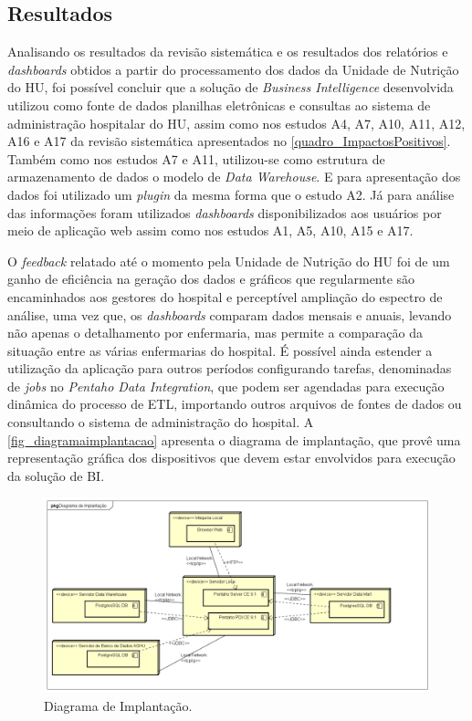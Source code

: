 \subsection{Resultados}

Analisando os resultados da revisão sistemática e os resultados dos relatórios e \textit{dashboards} obtidos a partir do processamento dos dados da Unidade de Nutrição do HU, foi possível concluir que a solução de \textit{Business Intelligence} desenvolvida utilizou como fonte de dados planilhas eletrônicas e consultas ao sistema de administração hospitalar do HU, assim como nos estudos A4, A7, A10, A11, A12, A16 e A17 da revisão sistemática apresentados no \autoref{quadro_ImpactosPositivos}. Também como nos estudos A7 e A11, utilizou-se como estrutura de armazenamento de dados o modelo de \textit{Data Warehouse}. E para apresentação dos dados foi utilizado um \textit{plugin} da mesma forma que o estudo A2. Já para análise das informações foram utilizados \textit{dashboards} disponibilizados aos usuários por meio de aplicação web assim como nos estudos A1, A5, A10, A15 e A17.

O \textit{feedback} relatado até o momento pela Unidade de Nutrição do HU foi de um ganho de eficiência na geração dos dados e gráficos que regularmente são encaminhados aos gestores do hospital e perceptível ampliação do espectro de análise, uma vez que, os \textit{dashboards} comparam dados mensais e anuais, levando não apenas o detalhamento por enfermaria, mas permite a comparação da situação entre as várias enfermarias do hospital. É possível ainda estender a utilização da aplicação para outros períodos configurando tarefas, denominadas de \textit{jobs} no \textit{Pentaho Data Integration}, que podem ser agendadas para execução dinâmica do processo de ETL, importando outros arquivos de fontes de dados ou consultando o sistema de administração do hospital. A \autoref{fig_diagramaimplantacao} apresenta o diagrama de implantação, que provê uma representação gráfica dos dispositivos que devem estar envolvidos para execução da solução de BI. 

\begin{figure}[htb]
	\caption{\label{fig_diagramaimplantacao}Diagrama de Implantação.}
	\begin{center}
	    \includegraphics[scale=0.41]{Imagens/figura - diagrama de implantação.png}
	\end{center}
\end{figure}

